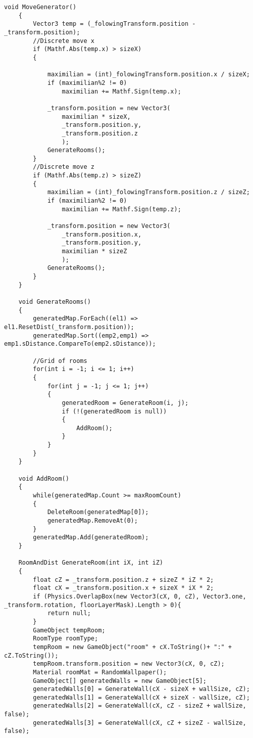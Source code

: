 \documentclass[14pt, titlepage,fleqn,a4paper]{extarticle}
\begin{document}
    \newpage
    \begin{lstlisting}[caption= Генератор карты, label=lst:test]
    void MoveGenerator()
    {
        Vector3 temp = (_folowingTransform.position - _transform.position);
        //Discrete move x
        if (Mathf.Abs(temp.x) > sizeX)
        {
            
            maximilian = (int)_folowingTransform.position.x / sizeX;
            if (maximilian%2 != 0)
                maximilian += Mathf.Sign(temp.x);

            _transform.position = new Vector3(
                maximilian * sizeX,
                _transform.position.y,
                _transform.position.z
                );
            GenerateRooms();
        }
        //Discrete move z
        if (Mathf.Abs(temp.z) > sizeZ)
        {
            maximilian = (int)_folowingTransform.position.z / sizeZ;
            if (maximilian%2 != 0)
                maximilian += Mathf.Sign(temp.z);

            _transform.position = new Vector3(
                _transform.position.x,
                _transform.position.y,
                maximilian * sizeZ
                );
            GenerateRooms();
        }
    }
    
    void GenerateRooms()
    {
        generatedMap.ForEach((el1) => el1.ResetDist(_transform.position));
        generatedMap.Sort((emp2,emp1) => emp1.sDistance.CompareTo(emp2.sDistance));
        
        //Grid of rooms
        for(int i = -1; i <= 1; i++)
        {
            for(int j = -1; j <= 1; j++)
            {
                generatedRoom = GenerateRoom(i, j);
                if (!(generatedRoom is null))
                {
                    AddRoom();
                }
            }
        }
    }

    void AddRoom()
    {
        while(generatedMap.Count >= maxRoomCount)
        {
            DeleteRoom(generatedMap[0]);
            generatedMap.RemoveAt(0);
        }
        generatedMap.Add(generatedRoom);
    }
    
    RoomAndDist GenerateRoom(int iX, int iZ)
    {
        float cZ = _transform.position.z + sizeZ * iZ * 2;
        float cX = _transform.position.x + sizeX * iX * 2;
        if (Physics.OverlapBox(new Vector3(cX, 0, cZ), Vector3.one, _transform.rotation, floorLayerMask).Length > 0){
            return null;
        }
        GameObject tempRoom;
        RoomType roomType;
        tempRoom = new GameObject("room" + cX.ToString()+ ":" + cZ.ToString());
        tempRoom.transform.position = new Vector3(cX, 0, cZ);
        Material roomMat = RandomWallpaper();
        GameObject[] generatedWalls = new GameObject[5];
        generatedWalls[0] = GenerateWall(cX - sizeX + wallSize, cZ);
        generatedWalls[1] = GenerateWall(cX + sizeX - wallSize, cZ);
        generatedWalls[2] = GenerateWall(cX, cZ - sizeZ + wallSize, false);
        generatedWalls[3] = GenerateWall(cX, cZ + sizeZ - wallSize, false);
        

\end{lstlisting}
\end{document}
